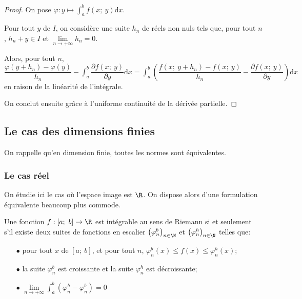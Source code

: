 \begin{proof}
On pose $\varphi: y \mapsto \displaystyle{\int_a^b} f(x;~y) \mathrm d x$.

Pour tout $y$ de $I$, on considère une suite $h_n$ de réels non nuls tels que, pour tout $n$, $h_n+y \in I$ et $\lim \limits_{n \to +\infty} h_n = 0$.

Alors, pour tout $n$, $\dfrac{\varphi(y+h_n)-\varphi(y)}{h_n} -  \displaystyle{\int_a^b} \dfrac{ \partial f(x;~y)}{\partial y} \mathrm d x = \displaystyle{\int_a^b} \left(\dfrac{f(x;~y+h_n)-f(x;~y)}{h_n} - \dfrac{\partial f(x;~y)}{\partial y} \right)\mathrm d x$ en raison de la linéarité de l'intégrale.

On conclut ensuite grâce à l'uniforme continuité de la dérivée partielle.
\end{proof}

\subsection{Le cas des dimensions finies}

On rappelle qu'en dimension finie, toutes les normes sont équivalentes.

\subsubsection{Le cas réel}

On étudie ici le cas où l'espace image est $\R$. On dispose alors d'une formulation équivalente beaucoup plus commode.

\begin{lem}
Une fonction $f: [a;~b] \to \R$ est intégrable au sens de Riemann si et seulement s'il existe deux suites de fonctions en escalier $\left(\varphi_n^b\right)_{n \in \N}$ et $\left(\varphi_n^h\right)_{n \in \N}$ telles que:
\begin{itemize}
\item[$\bullet$]  pour tout $x$ de $[a;~b]$, et pour tout $n$, $\varphi_n^b(x) \leq f(x) \leq \varphi_n^h(x)$;
\item[$\bullet$]  la suite $\varphi_n^b$ est croissante et la suite $\varphi_n^h$ est décroissante;
\item[$\bullet$]  $\lim \limits_{n \to +\infty} \displaystyle{\int_a^b} \left(\varphi_n^h - \varphi_n^b\right) = 0$
\end{itemize}

\end{lem}


